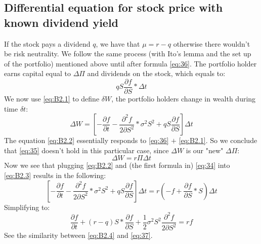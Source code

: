 \documentclass{article}
\begin{document}
\subsection{Differential equation for stock price with known dividend yield}
If the stock pays a dividend $q$, we have that $\mu = r - q$ otherwise there wouldn't be risk neutrality. We follow the same process (with Ito's lemma and the set up of the portfolio) mentioned above until after formula \ref{eq:36}. The portfolio holder earns capital equal to $\Delta\Pi$ and dividends on the stock, which equals to:
\begin{equation}\label{eq:B2.1}
    q S \frac{\partial f}{\partial S} * \Delta t
\end{equation}
We now use \ref{eq:B2.1} to define $\delta W$, the portfolio holders change in wealth during time $\delta t$:
\begin{equation}\label{eq:B2.2}
    \Delta W = \left[-\frac{\partial f}{\partial t} - \frac{\partial^2 f}{2 \partial S^2} * \sigma^2 S^2 + q S \frac{\partial f}{\partial S} \right] \Delta t
\end{equation}
The equation \ref{eq:B2.2} essentially responds to \ref{eq:36} $+$ \ref{eq:B2.1}. So we conclude that \ref{eq:35} doesn't hold in this particular case, since $\Delta W$ is our "new" $\Delta \Pi$:
\begin{equation}\label{eq:B2.3}
    \Delta W = r \Pi \Delta t
\end{equation}
Now we see that plugging \ref{eq:B2.2} and (the first formula in) \ref{eq:34} into \ref{eq:B2.3} results in the following:
\begin{equation}
    \left[-\frac{\partial f}{\partial t} - \frac{\partial^2 f}{2 \partial S^2} * \sigma^2 S^2 + q S \frac{\partial f}{\partial S} \right] \Delta t = r \left(-f + \frac{\partial f}{\partial S} * S\right) \Delta t
\end{equation}
Simplifying to:
\begin{equation}\label{eq:B2.4}
    \frac{\partial f}{\partial t} + (r - q) S * \frac{\partial f}{\partial S} + \frac{1}{2} \sigma^2 S^2 \frac{\partial^2 f}{2 \partial S^2} = r f
\end{equation}
See the similarity between \ref{eq:B2.4} and \ref{eq:37}.
\end{document}
